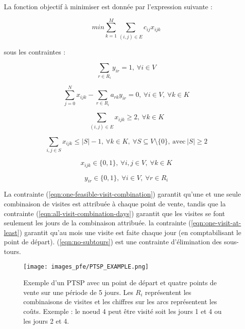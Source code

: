 La fonction objectif à minimiser est donnée par l'expression suivante :

\begin{equation*}
    min \sum_{k=1}^M \sum_{(i,j) \in E} c_{ij}x_{ijk}
\end{equation*}

sous les contraintes :

\begin{equation}
    \sum_{r \in R_i} y_{ir} = 1, \  \forall i \in V
    \label{eqn:one-feasible-visit-combination}
\end{equation}

\begin{equation}
    \sum_{j=0}^N x_{ijk} - \sum_{r \in R_i} a_{rk}y_{ir} = 0, \ \forall i \in V, \ \forall k \in K
    \label{eqn:all-visit-combination-days}
\end{equation}

\begin{equation}
    \sum_{(i,j) \in E} x_{ijk} \geqslant 2, \ \forall k \in K
    \label{eqn:one-visit-at-least}
\end{equation}

\begin{equation}
    \sum_{i,j \in S} x_{ijk} \leq |S| - 1, \ \forall k \in K, \ \forall S \subseteq V \setminus \{0\} , \ \textrm{avec} \ |S| \geqslant 2
    \label{eqn:no-subtours}
\end{equation}

\begin{equation}
    x_{ijk} \in \{0,1\}, \ \forall i,j \in V, \ \forall k \in K 
\end{equation}

\begin{equation}
    y_{ir} \in \{0,1\}, \ \forall i \in V, \ \forall r \in R_i
\end{equation}

La contrainte (\ref{eqn:one-feasible-visit-combination}) garantit qu'une et une seule combinaison de visites est attribuée à chaque point de vente, tandis que la contrainte (\ref{eqn:all-visit-combination-days}) garantit que les visites se font seulement les jours de la combinaison attribuée. la contrainte (\ref{eqn:one-visit-at-least}) garantit qu'au mois une visite est faite chaque jour (en comptabilisant le point de départ). (\ref{eqn:no-subtours}) est une contrainte d'élimination des sous-tours.


\begin{figure}[hbt!]
  \centering
  \texttt{[image: images\_pfe/PTSP\_EXAMPLE.png]}
  \caption{Exemple d'un PTSP avec un point de départ et quatre points de vente sur une période de 5 jours. Les $R_i$ représentent les combinaisons de visites et les chiffres sur les arcs représentent les coûts. Exemple : le noeud 4 peut être visité soit les jours 1 et 4 ou les jours 2 et 4.}
  \label{fig:ptsp-example}
\end{figure}
\FloatBarrier

